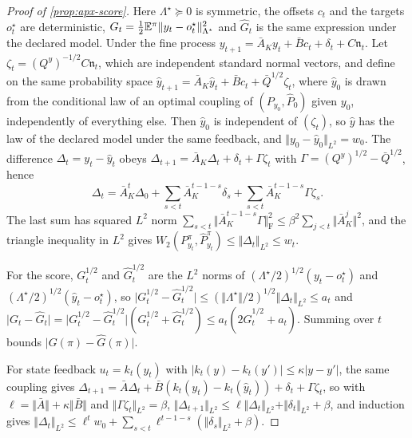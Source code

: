\begin{proof}[Proof of \cref{prop:apx-score}]
Here $\Lambda^\star\succeq0$ is symmetric, the offsets $c_t$ and the targets $o^\star_t$ are deterministic, $G_t=\frac12\mathbb{E}^\pi\Vert y_t-o^\star_t\Vert^2_{\Lambda^\star}$ and $\hat G_t$ is the same expression under the declared model. Under the fine process $y_{t+1}=\bar A_Ky_t+\bar Bc_t+\delta_t+C\mathfrak n_t$. Let $\zeta_t=(Q^y)^{-1/2}C\mathfrak n_t$, which are independent standard normal vectors, and define on the same probability space $\hat y_{t+1}=\bar A_K\hat y_t+\bar Bc_t+\bar Q^{1/2}\zeta_t$, where $\hat y_0$ is drawn from the conditional law of an optimal coupling of $(P_{y_0},\hat P_0)$ given $y_0$, independently of everything else. Then $\hat y_0$ is independent of $(\zeta_t)$, so $\hat y$ has the law of the declared model under the same feedback, and $\Vert y_0-\hat y_0\Vert_{L^2}=w_0$. The difference $\Delta_t=y_t-\hat y_t$ obeys $\Delta_{t+1}=\bar A_K\Delta_t+\delta_t+\Gamma\zeta_t$ with $\Gamma=(Q^y)^{1/2}-\bar Q^{1/2}$, hence
\begin{equation*}
\Delta_t=\bar A_K^t\Delta_0+\sum_{s<t}\bar A_K^{t-1-s}\delta_s+\sum_{s<t}\bar A_K^{t-1-s}\Gamma\zeta_s .
\end{equation*}
The last sum has squared $L^2$ norm $\sum_{s<t}\Vert\bar A_K^{t-1-s}\Gamma\Vert_{\mathrm F}^2\le\beta^2\sum_{j<t}\Vert\bar A_K^j\Vert^2$, and the triangle inequality in $L^2$ gives $W_2(P^\pi_{y_t},\hat P^\pi_{y_t})\le\Vert\Delta_t\Vert_{L^2}\le w_t$.

For the score, $G_t^{1/2}$ and $\hat G_t^{1/2}$ are the $L^2$ norms of $(\Lambda^\star/2)^{1/2}(y_t-o^\star_t)$ and $(\Lambda^\star/2)^{1/2}(\hat y_t-o^\star_t)$, so $\lvert G_t^{1/2}-\hat G_t^{1/2}\rvert\le(\Vert\Lambda^\star\Vert/2)^{1/2}\Vert\Delta_t\Vert_{L^2}\le a_t$ and $\lvert G_t-\hat G_t\rvert=\lvert G_t^{1/2}-\hat G_t^{1/2}\rvert(G_t^{1/2}+\hat G_t^{1/2})\le a_t(2\hat G_t^{1/2}+a_t)$. Summing over $t$ bounds $\lvert G(\pi)-\hat G(\pi)\rvert$.

For state feedback $u_t=k_t(y_t)$ with $\lvert k_t(y)-k_t(y')\rvert\le\kappa\lvert y-y'\rvert$, the same coupling gives $\Delta_{t+1}=\bar A\Delta_t+\bar B(k_t(y_t)-k_t(\hat y_t))+\delta_t+\Gamma\zeta_t$, so with $\ell=\Vert\bar A\Vert+\kappa\Vert\bar B\Vert$ and $\Vert\Gamma\zeta_t\Vert_{L^2}=\beta$, $\Vert\Delta_{t+1}\Vert_{L^2}\le\ell\Vert\Delta_t\Vert_{L^2}+\Vert\delta_t\Vert_{L^2}+\beta$, and induction gives $\Vert\Delta_t\Vert_{L^2}\le\ell^tw_0+\sum_{s<t}\ell^{t-1-s}(\Vert\delta_s\Vert_{L^2}+\beta)$.
\end{proof}

